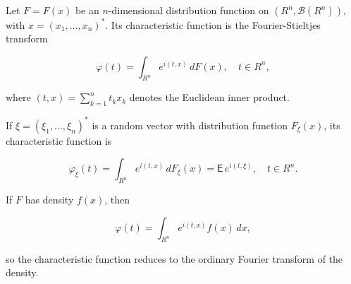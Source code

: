 Let $F = F(x)$ be an $n$-dimensional distribution function on $(R^n, \mathcal{B}(R^n))$, with $x = (x_1, \ldots, x_n)^*$. Its characteristic function is the Fourier-Stieltjes transform

$$\varphi(t) = \int_{R^n} e^{i(t, x)} \, dF(x), \quad t \in R^n,$$

where $(t, x) = \sum_{k=1}^{n} t_k x_k$ denotes the Euclidean inner product.

If $\xi = (\xi_1, \ldots, \xi_n)^*$ is a random vector with distribution function $F_\xi(x)$, its characteristic function is

$$\varphi_\xi(t) = \int_{R^n} e^{i(t, x)} \, dF_\xi(x) = \mathsf{E}\, e^{i(t, \xi)}, \quad t \in R^n.$$

If $F$ has density $f(x)$, then

$$\varphi(t) = \int_{R^n} e^{i(t, x)} f(x) \, dx,$$

so the characteristic function reduces to the ordinary Fourier transform of the density.
